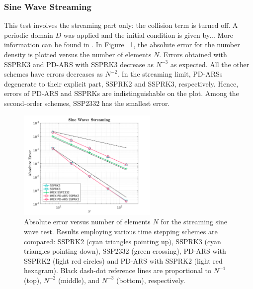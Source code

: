 \subsubsection{Sine Wave Streaming}
This test involves the streaming part only: the collision term is turned off. 
A periodic domain $D$ was applied and the initial condition is given by...
More information can be found in \cite{chu_2018}.
In Figure ~\ref{fig: SineWaveStreaming}, the absolute error for the number density is plotted versus the number of elements $N$.
Errors obtained with SSPRK3 and PD-ARS with SSPRK3 decrease as $N^{-3}$ as expected.
All the other schemes have errors decreases as $N^{-2}$.
In the streaming limit, PD-ARSs degenerate to their explicit part, SSPRK2 and SSPRK3, respectively.
Hence, errors of PD-ARS and SSPRKs are indistinguishable on the plot.
Among the second-order schemes, SSP2332 has the smallest error.
\begin{figure}[h]
  \centering
    \includegraphics[width=0.6\textwidth]{figures/SineWaveStreaming}
   \caption{Absolute error versus number of elements $N$ for the streaming sine wave test.  Results employing various time stepping schemes are compared: SSPRK2 (cyan triangles pointing up), SSPRK3 (cyan triangles pointing down), SSP2332 (green crossing), PD-ARS with SSPRK2 (light red circles) and PD-ARS with SSPRK2 (light red hexagram). Black dash-dot reference lines are proportional to $N^{-1}$ (top), $N^{-2}$ (middle), and $N^{-3}$ (bottom), respectively.}
   \label{fig: SineWaveStreaming}
\end{figure}

